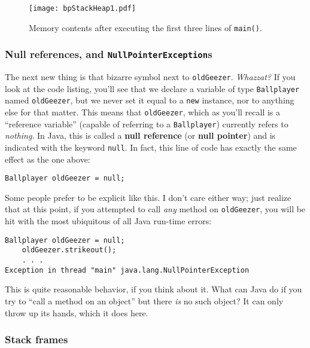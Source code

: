 \begin{figure}[ht]   %
\centering
\texttt{[image: bpStackHeap1.pdf]}
\caption{Memory contents after executing the first three lines of
\texttt{main()}.}
\label{fig:bpStackHeap1}
\end{figure}

\subsubsection{Null references, and \texttt{NullPointerException}s}

The next new thing is that bizarre symbol next to \texttt{oldGeezer}.
\textit{Whazzat?} If you look at the code listing, you'll see that we
declare a variable of type \texttt{Ballplayer} named \texttt{oldGeezer}, but
we never set it equal to a \texttt{new} instance, nor to anything else for
that matter. This means that \texttt{oldGeezer}, which as you'll recall is a
``reference variable'' (capable of referring to a \texttt{Ballplayer})
currently refers to \textit{nothing}. In Java, this is called a \textbf{null
reference} (or \textbf{null pointer}) and is indicated with the keyword
\texttt{null}. In fact, this line of code has exactly the same effect as the
one above:

\begin{Verbatim}[fontsize=\small,samepage=true]
Ballplayer oldGeezer = null;
\end{Verbatim}

Some people prefer to be explicit like this. I don't care either way; just
realize that at this point, if you attempted to call \textit{any} method on
\texttt{oldGeezer}, you will be hit with the most ubiquitous of all Java
run-time errors:

\begin{Verbatim}[fontsize=\small,samepage=true]
    Ballplayer oldGeezer = null;
    oldGeezer.strikeout();
    . . .
Exception in thread "main" java.lang.NullPointerException
\end{Verbatim}

This is quite reasonable behavior, if you think about it. What can Java do if
you try to ``call a method on an object'' but there \textit{is} no such object?
It can only throw up its hands, which it does here.

\subsubsection{Stack frames}

